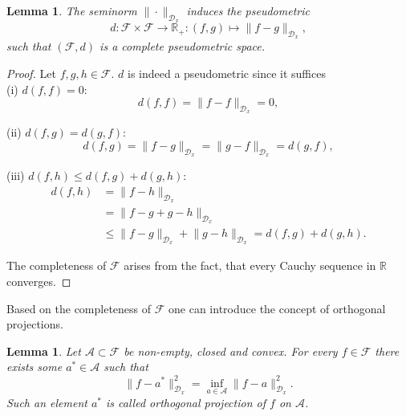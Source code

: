 \documentclass[11pt, a4paper]{article}
\newtheorem{lemma}[theorem]{Lemma}
\newcommand{\R}{\mathds{R}}
\newcommand{\A}{\mathcal{A}}
\newcommand{\D}{\mathcal{D}}
\newcommand{\F}{\mathcal{F}}
\begin{document}
\begin{lemma}
The seminorm $\| \cdot \|_{\D_x}$ induces the pseudometric
\[ d: \F \times \F \to \R_+ : (f,g) \mapsto \big \| f-g \big \|_{\D_x}, \]
such that $(\F,d)$ is a complete pseudometric space.
\end{lemma}

\begin{proof}
Let $f,g,h \in \F$. $d$ is indeed a pseudometric since it suffices \\

(i) $d(f,f) = 0$:
\[ d(f,f) = \big \| f - f \big \|_{\D_x} = 0, \]

(ii) $d(f,g) = d(g,f)$:
\[ d(f,g) = \big \| f - g \big \|_{\D_x} = \big \| g - f \big \|_{\D_x} = d(g,f), \]

(iii) $d(f,h) \le d(f,g) + d(g,h)$:
\[ \begin{split} 
d(f,h) &= \big \| f - h \big \|_{\D_x} \\\ &= \big \| f - g + g - h \big \|_{\D_x} \\\ &\le \big \| f - g  \big \|_{\D_x} + \big \| g - h \big \|_{\D_x} = d(f,g) + d(g,h). \end{split} \]

The completeness of $\F$ arises from the fact, that every Cauchy sequence in $\R$ converges.
\end{proof}

Based on the completeness of $\F$ one can introduce the concept of orthogonal projections.

\begin{lemma} \label{lem:projection}
Let $\A \subset \F$ be non-empty, closed and convex. For every $f \in \F$ there exists some $a^* \in \A$ such that 
\[ \big \| f - a^* \big \|_{\D_x}^2 = \inf_{a \in \A} \big \| f - a \big \|_{\D_x}^2. \]
Such an element $a^*$ is called orthogonal projection of $f$ on $\A$.
\end{lemma}
\end{document}

